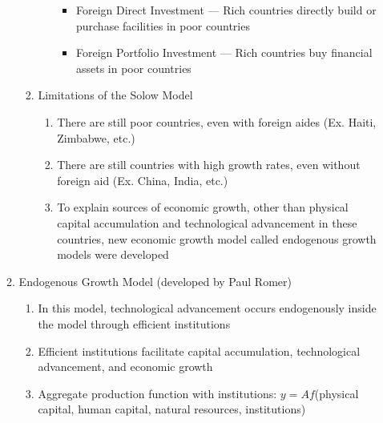 \documentclass[12pt]{article}
\begin{document}
\begin{enumerate}
\begin{enumerate}
\begin{enumerate}
\begin{enumerate}
                    \begin{itemize}

                      \item Foreign Direct Investment — Rich countries directly build or purchase facilities in poor countries

                      \item Foreign Portfolio Investment — Rich countries buy financial assets in poor countries

                    \end{itemize}

                \end{enumerate}

              \item Limitations of the Solow Model

                \begin{enumerate}

                  \item There are still poor countries, even with foreign aides (Ex. Haiti, Zimbabwe, etc.)

                  \item There are still countries with high growth rates, even without foreign aid (Ex. China, India, etc.)

                  \item To explain sources of economic growth, other than physical capital accumulation and technological advancement in these countries, new economic growth model called endogenous growth models were developed

                \end{enumerate}

            \end{enumerate}

          \item Endogenous Growth Model (developed by Paul Romer)

            \begin{enumerate}

              \item In this model, technological advancement occurs endogenously inside the model through efficient institutions

              \item Efficient institutions facilitate capital accumulation, technological advancement, and economic growth

              \item Aggregate production function with institutions: $y=Af$(physical capital, human capital, natural resources, institutions)


\end{enumerate}
\end{enumerate}
\end{enumerate}
\end{document}
